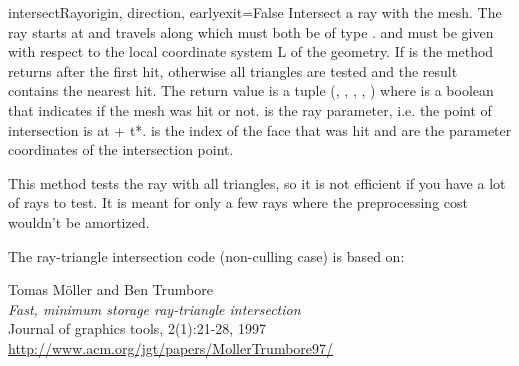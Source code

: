\begin{methoddesc}{intersectRay}{origin, direction, earlyexit=False}
Intersect a ray with the mesh. The ray starts at  and
travels along  which must both be of type .
 and  must be given with respect to the
local coordinate system L of the geometry. If  is
 the method returns after the first hit, otherwise all
triangles are tested and the result contains the nearest hit.
The return value is a tuple (, , , 
, ) where  is a boolean that indicates if
the mesh was hit or not.  is the ray parameter, i.e. the
point of intersection is at  + t*.
 is the index of the face that was hit and 
 are the parameter coordinates of the intersection point.

This method tests the ray with all triangles, so it is not efficient if
you have a lot of rays to test. It is meant for only a few rays where
the preprocessing cost wouldn't be amortized.
 
The ray-triangle intersection code (non-culling case) is based on:
 
Tomas M\"oller and Ben Trumbore\\
{\em Fast, minimum storage ray-triangle intersection}\\
Journal of graphics tools, 2(1):21-28, 1997\\
\url{http://www.acm.org/jgt/papers/MollerTrumbore97/}
\end{methoddesc}





